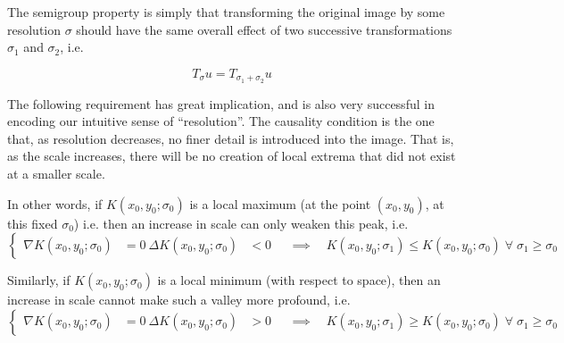     \begin{axiom} \label{axiom:semigroup}
    The semigroup property is simply that transforming
    the original image by some resolution $\sigma$ should
    have the same overall effect of two successive
    transformations $\sigma_1$ and $\sigma_2$, i.e.
    
    \begin{equation}	
	    T_{\sigma} u = T_{\sigma_1 + \sigma_2} u
    \end{equation}
    \end{axiom}
   

   \begin{axiom} \label{axiom:causality}
    The following requirement has great implication, and is also
    very successful in encoding our intuitive sense
    of ``resolution''. The causality condition is the one
    that, as resolution decreases, no finer detail is
    introduced into the image. That is, as the scale
    increases, there will be no creation of local extrema
    that did not exist at a smaller scale.
    \end{axiom}
    In other words, if 
    $K(x_0,y_0 ; \sigma_0)$ is a local maximum (at the point $(x_0, y_0)$, at this fixed $\sigma_0$)
    i.e. 
    then an increase in scale can only weaken this peak, i.e.
    \begin{equation}
    \left\{\begin{aligned}
    \nabla K(x_0,y_0; \sigma_0) &= 0 \
    \Delta K(x_0,y_0;\sigma_0) &< 0
    \end{aligned}\right.
	\quad \implies \quad
	K(x_0,y_0;\sigma_1) \le K(x_0,y_0;\sigma_0)
	\; \forall\; \sigma_1 \ge \sigma_0
    \end{equation}
    
    Similarly, if $K(x_0,y_0;\sigma_0)$ is a local minimum (with respect to space), then an increase in scale cannot make such a valley more profound, i.e.
   \begin{equation}
   \left\{\begin{aligned}
   \nabla K(x_0,y_0; \sigma_0) &= 0 \
	\Delta K(x_0,y_0;\sigma_0) &> 0
	\end{aligned}\right.
	\quad \implies \quad
	K(x_0,y_0;\sigma_1) \ge K(x_0,y_0;\sigma_0)
	\; \forall\; \sigma_1 \ge \sigma_0
	\end{equation}
    
